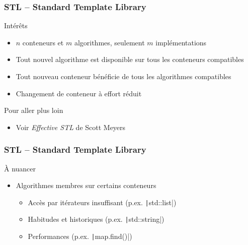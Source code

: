 \documentclass[C++.tex]{subfiles}
\begin{document}
\begin{frame}[fragile]
	\frametitle{STL -- Standard Template Library}
	\begin{block}{Intérêts}
		\begin{itemize}
			\item $n$ conteneurs et $m$ algorithmes, seulement $m$ implémentations
			\item Tout nouvel algorithme est disponible sur tous les conteneurs compatibles
			\item Tout nouveau conteneur bénéficie de tous les algorithmes compatibles
			\item Changement de conteneur à effort réduit
		\end{itemize}
	\end{block}

	\begin{block}{Pour aller plus loin}
		\begin{itemize}
			\item Voir \textit{Effective STL} de Scott Meyers
		\end{itemize}
	\end{block}
\end{frame}

\begin{frame}[fragile]
	\frametitle{STL -- Standard Template Library}
	\begin{block}{À nuancer}
		\begin{itemize}
			\item Algorithmes membres sur certains conteneurs
			\begin{itemize}
				\item Accès par itérateurs insuffisant (p.ex. \texttt|std::list|)
				\item Habitudes et historiques (p.ex. \texttt|std::string|)
				\item Performances (p.ex. \texttt|map.find()|)
			\end{itemize}
		\end{itemize}
	\end{block}
\end{frame}
\end{document}

